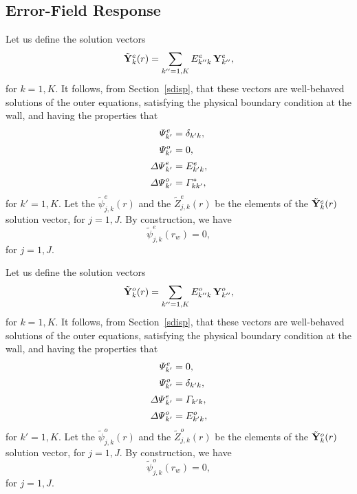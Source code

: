 \documentclass[12pt,prb,aps,notitlepage]{revtex4-1}
\begin{document}
\subsection{Error-Field Response}
Let us define the  solution vectors
\begin{equation}
\tilde{\bf Y}_k^e(r) = \sum_{k''=1,K} E^e_{k''k}\,{\bf Y}_{k''}^e,
\end{equation}
for $k=1,K$. 
It follows, from Section~\ref{sdisp}, that these vectors are well-behaved solutions of the outer equations, satisfying the
physical boundary condition at the wall, and having  the properties that 
\begin{align}
{\mit\Psi}_{k'}^e &= \delta_{k'k},\\[0.5ex]
{\mit\Psi}_{k'}^o &= 0,\\[0.5ex]
{\mit\Delta\Psi}_{k'}^e &= E_{k'k}^e,\\[0.5ex]
{\mit\Delta\Psi}_{k'}^o &= {\mit\Gamma}^\ast_{kk'},
\end{align}
for $k'=1,K$. Let the $\tilde{\psi}_{j,k}^e(r)$ and the $\tilde{Z}_{j,k}^e(r)$ be the elements of the $\tilde{\bf Y}_k^e(r)$ solution vector, for
$j = 1,J$. By construction, we have
\begin{equation}
\tilde{\psi}_{j,k}^e(r_w) = 0,
\end{equation}
for $j=1,J$. 

Let us define the  solution vectors 
\begin{equation}
\tilde{\bf Y}_k^o(r)= \sum_{k''=1,K} E^o_{k''k}\,{\bf Y}_{k''}^o,
\end{equation}
for $k=1,K$. 
It follows, from Section~\ref{sdisp}, that these vectors are well-behaved solutions of the outer equations, satisfying the
physical boundary condition at the wall, and having the properties that 
\begin{align}
{\mit\Psi}_{k'}^e &= 0,\\[0.5ex]
{\mit\Psi}_{k'}^o &= \delta_{k'k},\\[0.5ex]
{\mit\Delta\Psi}_{k'}^e &= {\mit\Gamma}_{k'k},\\[0.5ex]
{\mit\Delta\Psi}_{k'}^o &= E^o_{k'k},
\end{align}
for $k'=1,K$. Let the $\tilde{\psi}_{j,k}^o(r)$ and the $\tilde{Z}_{j,k}^o(r)$ be the elements of the $\tilde{\bf Y}_k^o(r)$ solution vector, for
$j = 1,J$. By construction, we have
\begin{equation}
\tilde{\psi}_{j,k}^o(r_w) = 0,
\end{equation}
for $j=1,J$. 
\end{document}
